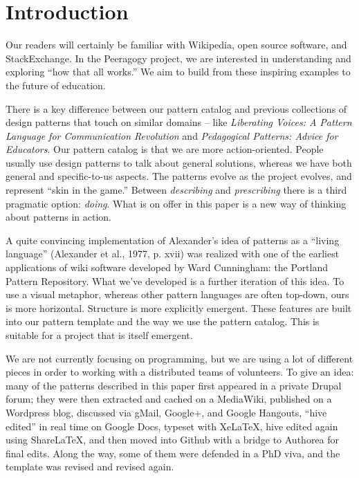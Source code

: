 \section{Introduction}

Our readers will certainly be familiar with Wikipedia, open source software, and StackExchange.  In the Peeragogy project, we are interested in understanding and exploring ``how that all works.''  We aim to build from these inspiring examples to the future of education.

There is a key difference between our pattern catalog and previous collections of design patterns that touch on similar domains -- like \emph{Liberating Voices: A Pattern Language for Communication Revolution} and \emph{Pedagogical Patterns: Advice for Educators}.  Our pattern catalog is that we are more action-oriented.  People usually use design patterns to talk about general solutions, whereas we have both general and specific-to-us aspects. The patterns evolve as the project evolves, and represent ``skin in the game.''   Between \emph{describing} and \emph{prescribing} there is a third pragmatic option: \emph{doing}.   What is on offer in this paper is a new way of thinking about patterns in action.

A quite convincing implementation of Alexander’s idea of patterns as a “living language” (Alexander et
al., 1977, p. xvii) was realized with one of the earliest applications of wiki
software developed by Ward Cunningham: the Portland Pattern Repository.
What we've developed is a further iteration of this idea. To use a visual metaphor, whereas other pattern languages are often top-down, ours is more horizontal.  Structure is more explicitly emergent.  These features are built
into our pattern template and the way we use the pattern catalog.  This is suitable for a project
that is itself emergent.

We are not currently focusing on programming, but we are using a lot of different pieces in order to working with a distributed teams of volunteers.  To give an idea: many of the patterns described in this paper first appeared in a private Drupal forum; they were then extracted and cached on a MediaWiki, published on a Wordpress blog, discussed via gMail, Google+, and Google Hangouts, ``hive edited'' in real time on Google Docs, typeset with XeLaTeX, hive edited again using ShareLaTeX, and then moved into Github with a bridge to Authorea for final edits.  Along the way, some of them were defended in a PhD viva, and the template was revised and revised again.


